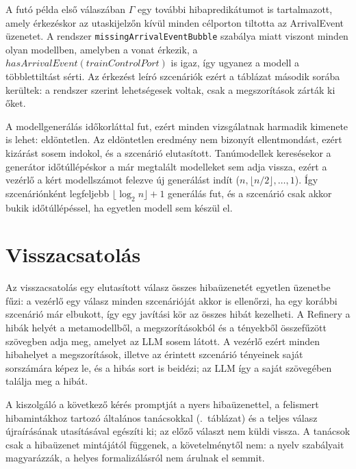 A futó példa első válaszában $\Gamma$ egy további hibapredikátumot is tartalmazott, amely érkezéskor az utaskijelzőn kívül minden célporton tiltotta az ArrivalEvent üzenetet. A rendszer \texttt{missingArrivalEventBubble} szabálya miatt viszont minden olyan modellben, amelyben a vonat érkezik, a $\mathit{hasArrivalEvent}(\mathit{trainControlPort})$ is igaz, így ugyanez a modell a többlettiltást sérti. Az érkezést leíró szcenáriók ezért a táblázat második sorába kerültek: a rendszer szerint lehetségesek voltak, csak a megszorítások zárták ki őket.

A modellgenerálás időkorláttal fut, ezért minden vizsgálatnak harmadik kimenete is lehet: eldöntetlen. Az eldöntetlen eredmény nem bizonyít ellentmondást, ezért kizárást sosem indokol, és a szcenárió elutasított. Tanúmodellek keresésekor a generátor időtúllépéskor a már megtalált modelleket sem adja vissza, ezért a vezérlő a kért modellszámot felezve új generálást indít ($n, \lfloor n/2 \rfloor, \dots, 1$). Így szcenáriónként legfeljebb $\lfloor \log_2 n \rfloor + 1$ generálás fut, és a szcenárió csak akkor bukik időtúllépéssel, ha egyetlen modell sem készül el.


\section{Visszacsatolás}
\label{sec:impl-feedback}

Az  visszacsatolás egy elutasított válasz összes hibaüzenetét egyetlen üzenetbe fűzi: a vezérlő egy válasz minden szcenárióját akkor is ellenőrzi, ha egy korábbi szcenárió már elbukott, így egy javítási kör az összes hibát kezelheti. A Refinery a hibák helyét a metamodellből, a megszorításokból és a tényekből összefűzött szövegben adja meg, amelyet az LLM sosem látott. A vezérlő ezért minden hibahelyet a megszorítások, illetve az érintett szcenárió tényeinek saját sorszámára képez le, és a hibás sort is beidézi; az LLM így a saját szövegében találja meg a hibát.

A kiszolgáló a következő kérés promptját a nyers hibaüzenettel, a felismert hibamintákhoz tartozó általános tanácsokkal (.~táblázat) és a teljes válasz újraírásának utasításával egészíti ki; az előző választ nem küldi vissza. A tanácsok csak a hibaüzenet mintájától függenek, a követelménytől nem: a nyelv szabályait magyarázzák, a helyes formalizálásról nem árulnak el semmit.

